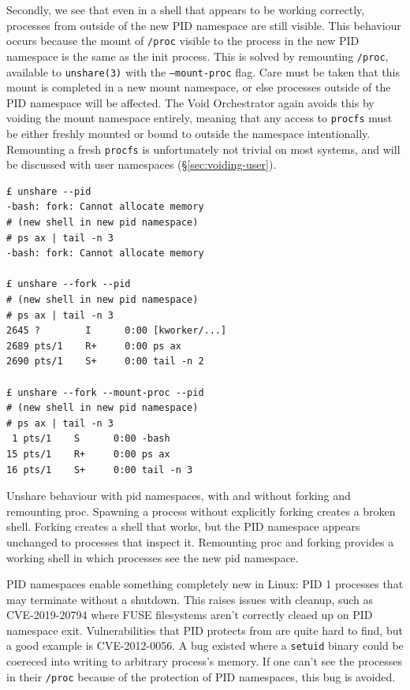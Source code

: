 \documentclass[12pt,a4paper,twoside]{report}
\begin{document}
Secondly, we see that even in a shell that appears to be working correctly, processes from outside of the new PID namespace are still visible. This behaviour occurs because the mount of \texttt{/proc} visible to the process in the new PID namespace is the same as the init process. This is solved by remounting \texttt{/proc}, available to \texttt{unshare(3)} with the \texttt{---mount-proc} flag. Care must be taken that this mount is completed in a new mount namespace, or else processes outside of the PID namespace will be affected. The Void Orchestrator again avoids this by voiding the mount namespace entirely, meaning that any access to \texttt{procfs} must be either freshly mounted or bound to outside the namespace intentionally. Remounting a fresh \texttt{procfs} is unfortunately not trivial on most systems, and will be discussed with user namespaces (§\ref{sec:voiding-user}).

\begin{listing}
\begin{verbatim}
£ unshare --pid
-bash: fork: Cannot allocate memory
# (new shell in new pid namespace)
# ps ax | tail -n 3
-bash: fork: Cannot allocate memory

£ unshare --fork --pid
# (new shell in new pid namespace)
# ps ax | tail -n 3
2645 ?        I      0:00 [kworker/...]
2689 pts/1    R+     0:00 ps ax
2690 pts/1    S+     0:00 tail -n 2

£ unshare --fork --mount-proc --pid
# (new shell in new pid namespace)
# ps ax | tail -n 3
 1 pts/1    S      0:00 -bash
15 pts/1    R+     0:00 ps ax
16 pts/1    S+     0:00 tail -n 3
\end{verbatim}

\caption{Unshare behaviour with pid namespaces, with and without forking and remounting proc. Spawning a process without explicitly forking creates a broken shell. Forking creates a shell that works, but the PID namespace appears unchanged to processes that inspect it. Remounting proc and forking provides a working shell in which processes see the new pid namespace.}
\label{lst:unshare-pid}
\end{listing}

PID namespaces enable something completely new in Linux: PID 1 processes that may terminate without a shutdown. This raises issues with cleanup, such as CVE-2019-20794 where FUSE filesystems aren't correctly cleaed up on PID namespace exit. Vulnerabilities that PID protects from are quite hard to find, but a good example is CVE-2012-0056. A bug existed where a \texttt{setuid} binary could be coereced into writing to arbitrary process's memory. If one can't see the processes in their \texttt{/proc} because of the protection of PID namespaces, this bug is avoided.
\end{document}
